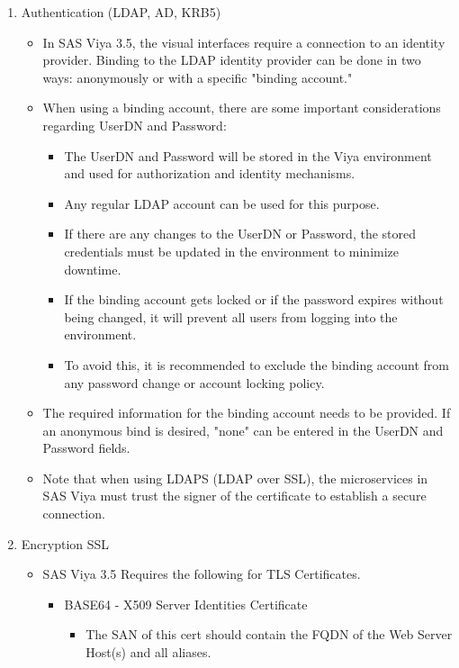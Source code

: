 \begin{enumerate}
    \item Authentication (LDAP, AD, KRB5)
    \begin{itemize}
        \item In SAS Viya 3.5, the visual interfaces require a connection to an identity provider. Binding to the LDAP identity provider can be done in two ways: anonymously or with a specific "binding account."
        \item When using a binding account, there are some important considerations regarding UserDN and Password:
        \begin{itemize}
            \item The UserDN and Password will be stored in the Viya environment and used for authorization and identity mechanisms.
            \item Any regular LDAP account can be used for this purpose.
            \item If there are any changes to the UserDN or Password, the stored credentials must be updated in the environment to minimize downtime.
            \item If the binding account gets locked or if the password expires without being changed, it will prevent all users from logging into the environment.
            \item To avoid this, it is recommended to exclude the binding account from any password change or account locking policy.
        \end{itemize}
        \item The required information for the binding account needs to be provided. If an anonymous bind is desired, "none" can be entered in the UserDN and Password fields.
        \item Note that when using LDAPS (LDAP over SSL), the microservices in SAS Viya must trust the signer of the certificate to establish a secure connection.
    \end{itemize}
    \item Encryption SSL 
    \begin{itemize}
        \item SAS Viya 3.5 Requires the following for TLS Certificates.
        \begin{itemize}
            \item BASE64 - X509 Server Identities Certificate
            \begin{itemize}
                \item The SAN of this cert should contain the FQDN of the Web Server Host(s) and all aliases.

\end{itemize}
\end{itemize}
\end{itemize}
\end{enumerate}
